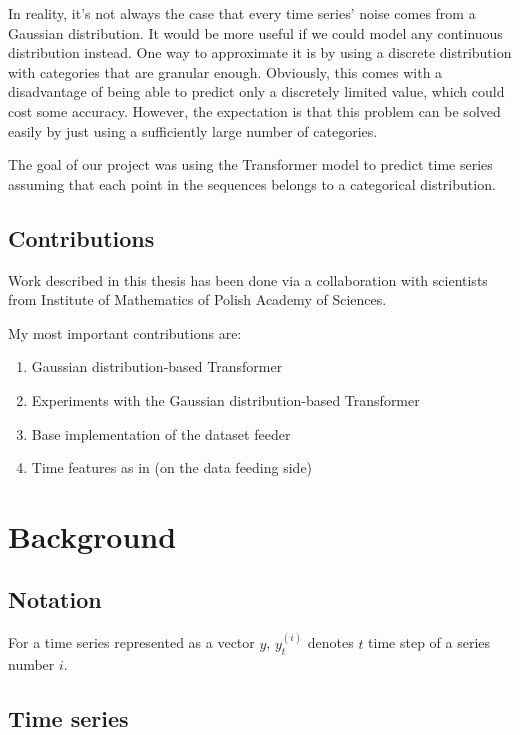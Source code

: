 \documentclass[en]{pracamgr}
\begin{document}
In reality, it's not always the case that every time series' noise comes from a Gaussian distribution.
It would be more useful if we could model any continuous distribution instead. One way to approximate it is by using a discrete distribution with categories that are granular enough. Obviously, this comes with a disadvantage of being able to predict only a discretely limited value, which could cost some accuracy. However, the expectation is that this problem can be solved easily by just using a sufficiently large number of categories.

The goal of our project was using the Transformer model to predict time series assuming that each point in the sequences belongs to a categorical distribution.



\section{Contributions}\label{r:contributions}

Work described in this thesis has been done via a collaboration with scientists from Institute of Mathematics of Polish Academy of Sciences.

My most important contributions are:
\begin{enumerate}
	\item Gaussian distribution-based Transformer
	\item Experiments with the Gaussian distribution-based Transformer
	\item Base implementation of the dataset feeder
	\item Time features as in \cite{enhancing} (on the data feeding side)
\end{enumerate}

\chapter{Background}\label{r:background}

\section{Notation}

For a time series represented as a vector $y$, $y^{(i)}_t$ denotes $t$ time step of a series number $i$.

\section{Time series}
\end{document}
